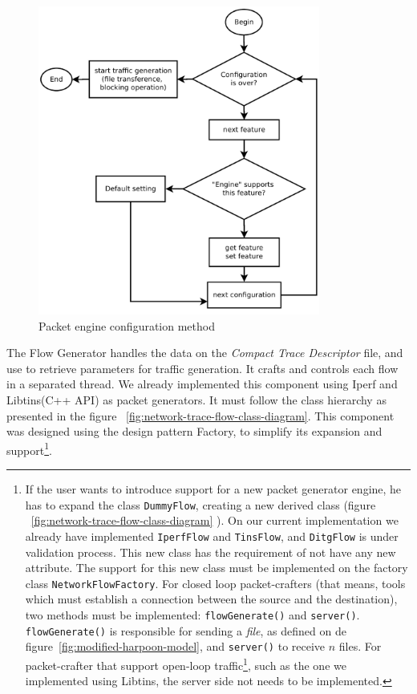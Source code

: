 \begin{figure}[ht!]
    \centering
    \includegraphics[height=4.0in]{figures/ch3/alg-traffic-engine-config}
    \caption{Packet engine configuration method}
    \label{fig:alg-traffic-engine-config}
\end{figure}


The Flow Generator handles the data on the \textit{Compact Trace Descriptor} file, and use to retrieve parameters for traffic generation. It crafts and controls each flow in a separated thread. We already implemented this component using Iperf and Libtins(C++ API) as packet generators. It must follow the class hierarchy as presented in the figure ~\ref{fig:network-trace-flow-class-diagram}.  This component was designed using the design pattern Factory, to simplify its expansion and support\footnote{If the user wants to introduce support for a new packet generator engine, he has to expand the class \texttt{DummyFlow}, creating a new derived class (figure ~\ref{fig:network-trace-flow-class-diagram} ). On our current implementation we already have implemented \texttt{IperfFlow} and \texttt{TinsFlow}, and \texttt{DitgFlow} is under validation process. This new class has the requirement of not have any new attribute. The support for this new class must be implemented on the factory class \texttt{NetworkFlowFactory}. For closed loop packet-crafters (that means, tools which must establish a connection between the source and the destination), two methods must be implemented: \texttt{flowGenerate()} and \texttt{server()}. \texttt{flowGenerate()} is responsible for sending a \textit{file}, as defined on de figure~\ref{fig:modified-harpoon-model}, and \texttt{server()} to receive $n$ files. For packet-crafter that support open-loop traffic\footnote{just sent the packets, do not establishes a connection}, such as the one we implemented using Libtins, the server side not needs to be implemented.}. 



